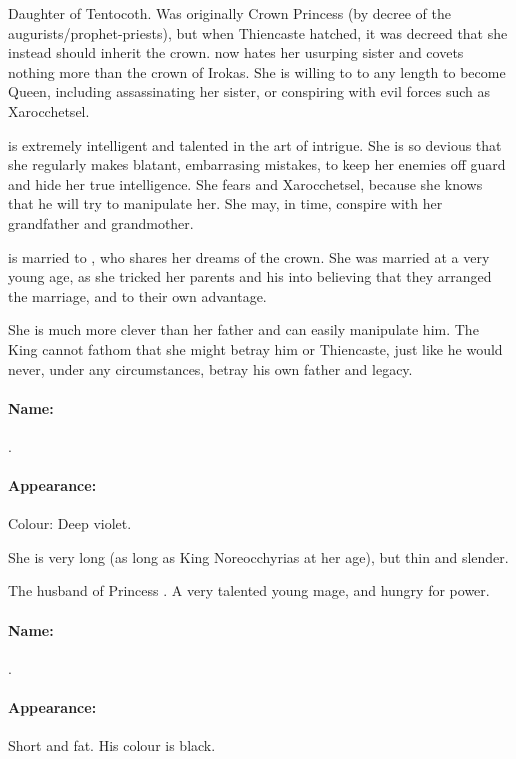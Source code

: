 \subsectionn{\Cryocas{}}
Daughter of Tentocoth. Was originally Crown Princess (by decree of the augurists/prophet-priests), but when Thiencaste hatched, it was decreed that she instead should inherit the crown. \Cryocas{} now hates her usurping sister and covets nothing more than the crown of Irokas. She is willing to to any length to become Queen, including assassinating her sister, or conspiring with evil forces such as Xarocchetsel. 

\Cryocas{} is extremely intelligent and talented in the art of intrigue. She is so devious that she regularly makes blatant, embarrasing mistakes, to keep her enemies off guard and hide her true intelligence. She fears \NerrhanKoss{} and Xarocchetsel, because she knows that he will try to manipulate her. She may, in time, conspire with her grandfather and grandmother. 

\Cryocas{} is married to \Nisgzarchief{}, who shares her dreams of the crown. She was married at a very young age, as she tricked her parents and his into believing that they arranged the marriage, and to their own advantage. 

She is much more clever than her father and can easily manipulate him. The King cannot fathom that she might betray him or Thiencaste, just like he would never, under any circumstances, betray his own father and legacy. 

\paragraph{Name:}
.

\paragraph{Appearance:}
Colour: Deep violet. 

She is very long (as long as King Noreocchyrias at her age), but thin and slender. 



\subsectionn{\Nisgzarchief{}}
The husband of Princess \Cryocas{}. A very talented young mage, and hungry for power. 

\paragraph{Name:}
.

\paragraph{Appearance:}
Short and fat. His colour is black. 




